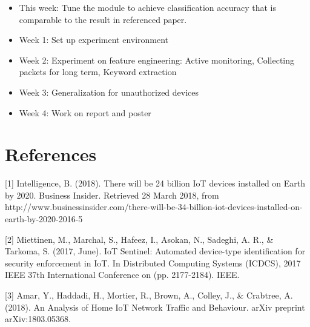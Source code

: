 \documentclass[twocolumn,10pt]{article}
\begin{document}
\begin{itemize}
   \item This week: Tune the module to achieve classification accuracy that is comparable to the result in referenced paper.
   \item Week 1: Set up experiment environment 
   \item Week 2: Experiment on feature engineering: Active monitoring, Collecting packets for long term, Keyword extraction
   \item Week 3: Generalization for unauthorized devices
   \item Week 4: Work on report and poster
\end{itemize}

\section{References}

[1] Intelligence, B. (2018). There will be 24 billion IoT devices installed on Earth by 2020. Business Insider. Retrieved 28 March 2018, from http://www.businessinsider.com/there-will-be-34-billion-iot-devices-installed-on-earth-by-2020-2016-5

[2] Miettinen, M., Marchal, S., Hafeez, I., Asokan, N., Sadeghi, A. R., \& Tarkoma, S. (2017, June). IoT Sentinel: Automated device-type identification for security enforcement in IoT. In Distributed Computing Systems (ICDCS), 2017 IEEE 37th International Conference on (pp. 2177-2184). IEEE.

[3] Amar, Y., Haddadi, H., Mortier, R., Brown, A., Colley, J., \& Crabtree, A. (2018). An Analysis of Home IoT Network Traffic and Behaviour. arXiv preprint arXiv:1803.05368.

{
\footnotesize
\raggedright


}

%
\end{document}
